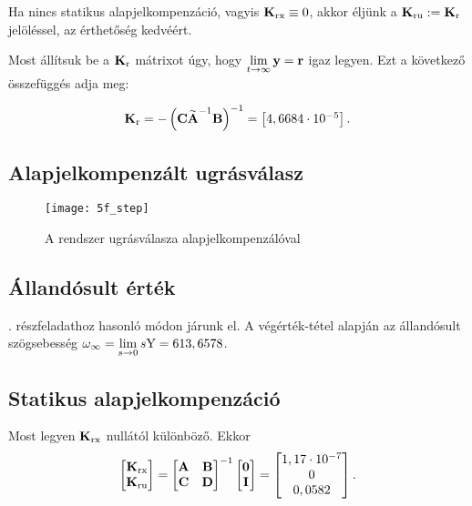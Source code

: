 Ha nincs statikus alapjelkompenzáció, vagyis $\boldsymbol{\mathrm{K}}_\text{rx}\equiv0$, akkor éljünk
a $\boldsymbol{\mathrm{K}}_\text{ru}:=\boldsymbol{\mathrm{K}}_\text{r}$ jelöléssel, az érthetőség kedvéért.

Most állítsuk be a $\boldsymbol{\mathrm{K}}_\text{r}$ mátrixot úgy, hogy
$\lim\limits_{t\rightarrow\infty}\boldsymbol{\mathrm{y}}=\boldsymbol{\mathrm{r}}$ igaz legyen.
Ezt a következő összefüggés adja meg:

\begin{equation}
	\boldsymbol{\mathrm{K}}_\text{r} = -\left(\boldsymbol{\mathrm{C}}\widetilde{\boldsymbol{\mathrm{A}}}^{-1}\boldsymbol{\mathrm{B}}\right)^{-1} = \begin{bmatrix}4,6684\cdot10^{-5}\end{bmatrix}.
\end{equation}


\subsection{Alapjelkompenzált ugrásválasz}

\begin{figure}[H]
	\centering
	\texttt{[image: 5f\_step]}
	\caption{A rendszer ugrásválasza alapjelkompenzálóval}
	\label{fig:5f_step}
\end{figure}


\subsection{Állandósult érték}

. részfeladathoz hasonló módon járunk el.
A végérték-tétel alapján az állandósult szögsebesség $\omega_\infty = \lim\limits_{s\rightarrow 0}s\mathrm{Y} = 613,6578$.


\subsection{Statikus alapjelkompenzáció}

Most legyen $\boldsymbol{\mathrm{K}}_\text{rx}$ nullától különböző.
Ekkor
\begin{equation}
	\begin{bmatrix}\boldsymbol{\mathrm{K}}_\text{rx}\\\boldsymbol{\mathrm{K}}_\text{ru}\end{bmatrix}=\begin{bmatrix}\boldsymbol{\mathrm{A}}&\boldsymbol{\mathrm{B}}\\\boldsymbol{\mathrm{C}}&\boldsymbol{\mathrm{D}}\end{bmatrix}^{-1}\begin{bmatrix}\boldsymbol{\mathrm{0}}\\\boldsymbol{\mathrm{I}}\end{bmatrix}
	= \begin{bmatrix}1,17\cdot10^{-7}\\0\\0,0582\end{bmatrix}.
\end{equation}

